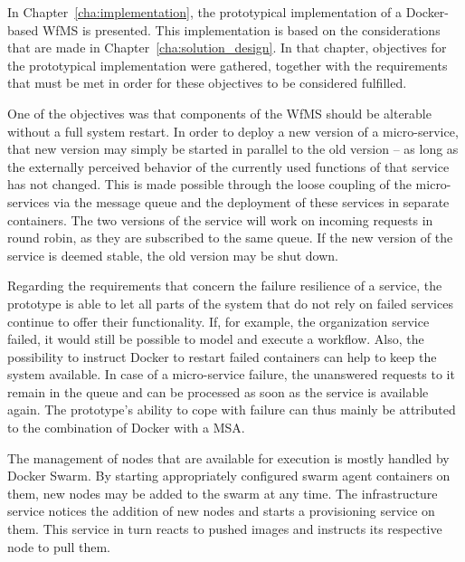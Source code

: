   In Chapter~\ref{cha:implementation}, the prototypical implementation of a Docker-based \ac{WfMS} is presented. This implementation is based on the considerations that are made in Chapter~\ref{cha:solution_design}. In that chapter, objectives for the prototypical implementation were gathered, together with the requirements that must be met in order for these objectives to be considered fulfilled.


  One of the objectives was that components of the \ac{WfMS} should be alterable without a full system restart. In order to deploy a new version of a micro-service, that new version may simply be started in parallel to the old version -- as long as the externally perceived behavior of the currently used functions of that service has not changed. This is made possible through the loose coupling of the micro-services via the message queue and the deployment of these services in separate containers. The two versions of the service will work on incoming requests in round robin, as they are subscribed to the same queue. If the new version of the service is deemed stable, the old version may be shut down.

  Regarding the requirements that concern the failure resilience of a service, the prototype is able to let all parts of the system that do not rely on failed services continue to offer their functionality. If, for example, the organization service failed, it would still be possible to model and execute a workflow. Also, the possibility to instruct Docker to restart failed containers can help to keep the system available. In case of a micro-service failure, the unanswered requests to it remain in the queue and can be processed as soon as the service is available again. The prototype's ability to cope with failure can thus mainly be attributed to the combination of Docker with a \ac{MSA}.

  The management of nodes that are available for execution is mostly handled by Docker Swarm. By starting appropriately configured swarm agent containers on them, new nodes may be added to the swarm at any time. The infrastructure service notices the addition of new nodes and starts a provisioning service on them. This service in turn reacts to pushed images and instructs its respective node to pull them.


